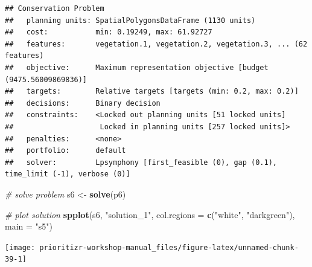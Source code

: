\documentclass[12pt,]{book}
\newenvironment{Shaded}{\begin{snugshade}}{\end{snugshade}}
\newcommand{\KeywordTok}[1]{\textcolor[rgb]{0.13,0.29,0.53}{\textbf{#1}}}
\newcommand{\DataTypeTok}[1]{\textcolor[rgb]{0.13,0.29,0.53}{#1}}
\newcommand{\FloatTok}[1]{\textcolor[rgb]{0.00,0.00,0.81}{#1}}
\newcommand{\StringTok}[1]{\textcolor[rgb]{0.31,0.60,0.02}{#1}}
\newcommand{\CommentTok}[1]{\textcolor[rgb]{0.56,0.35,0.01}{\textit{#1}}}
\newcommand{\OperatorTok}[1]{\textcolor[rgb]{0.81,0.36,0.00}{\textbf{#1}}}
\newcommand{\NormalTok}[1]{#1}
\begin{document}
\begin{verbatim}
## Conservation Problem
##   planning units: SpatialPolygonsDataFrame (1130 units)
##   cost:           min: 0.19249, max: 61.92727
##   features:       vegetation.1, vegetation.2, vegetation.3, ... (62 features)
##   objective:      Maximum representation objective [budget (9475.56009869836)]
##   targets:        Relative targets [targets (min: 0.2, max: 0.2)]
##   decisions:      Binary decision 
##   constraints:    <Locked out planning units [51 locked units]
##                    Locked in planning units [257 locked units]>
##   penalties:      <none>
##   portfolio:      default
##   solver:         Lpsymphony [first_feasible (0), gap (0.1), time_limit (-1), verbose (0)]
\end{verbatim}

\begin{Shaded}
\begin{Highlighting}[]
\CommentTok{# solve problem}
\NormalTok{s6 <-}\StringTok{ }\KeywordTok{solve}\NormalTok{(p6)}

\CommentTok{# plot solution}
\KeywordTok{spplot}\NormalTok{(s6, }\StringTok{"solution_1"}\NormalTok{, }\DataTypeTok{col.regions =} \KeywordTok{c}\NormalTok{(}\StringTok{"white"}\NormalTok{, }\StringTok{"darkgreen"}\NormalTok{), }\DataTypeTok{main =} \StringTok{"s5"}\NormalTok{)}
\end{Highlighting}
\end{Shaded}

\begin{center}\texttt{[image: prioritizr-workshop-manual\_files/figure-latex/unnamed-chunk-39-1]} \end{center}

\begin{Shaded}
\end{Shaded}
\end{document}
